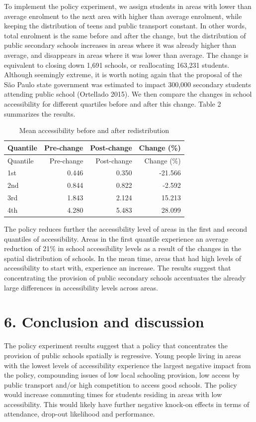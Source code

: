 \documentclass[]{article}
\begin{document}
To implement the policy experiment, we assign students in areas with
lower than average enrolment to the next area with higher than average
enrolment, while keeping the distribution of teens and public transport
constant. In other words, total enrolment is the same before and after
the change, but the distribution of public secondary schools increases
in areas where it was already higher than average, and disappears in
areas where it was lower than average. The change is equivalent to
closing down 1,691 schools, or reallocating 163,231 students. Although
seemingly extreme, it is worth noting again that the proposal of the São
Paulo state government was estimated to impact 300,000 secondary
students attending public school (Ortellado 2015). We then compare the
changes in school accessibility for different quartiles before and after
this change. Table 2 summarizes the results.

\begin{longtable}[c]{@{}lrrr@{}}
\caption{Mean accessibility before and after
redistribution}\tabularnewline
\toprule
Quantile & Pre-change & Post-change & Change (\%)\tabularnewline
\midrule
\endfirsthead
\toprule
Quantile & Pre-change & Post-change & Change (\%)\tabularnewline
\midrule
\endhead
1st & 0.446 & 0.350 & -21.566\tabularnewline
2nd & 0.844 & 0.822 & -2.592\tabularnewline
3rd & 1.843 & 2.124 & 15.213\tabularnewline
4th & 4.280 & 5.483 & 28.099\tabularnewline
\bottomrule
\end{longtable}

\newpage

The policy reduces further the accessibility level of areas in the first
and second quantiles of accessibility. Areas in the first quantile
experience an average reduction of 21\% in school accessibility levels
as a result of the changes in the spatial distribution of schools. In
the mean time, areas that had high levels of accessibility to start
with, experience an increase. The results suggest that concentrating the
provision of public secondary schools accentuates the already large
differences in accessibility levels across areas.

\section{6. Conclusion and discussion}\label{conclusion-and-discussion}

The policy experiment results suggest that a policy that concentrates
the provision of public schools spatially is regressive. Young people
living in areas with the lowest levels of accessibility experience the
largest negative impact from the policy, compounding issues of low local
schooling provision, low access by public transport and/or high
competition to access good schools. The policy would increase commuting
times for students residing in areas with low accessibility. This would
likely have further negative knock-on effects in terms of attendance,
drop-out likelihood and performance.
\end{document}
